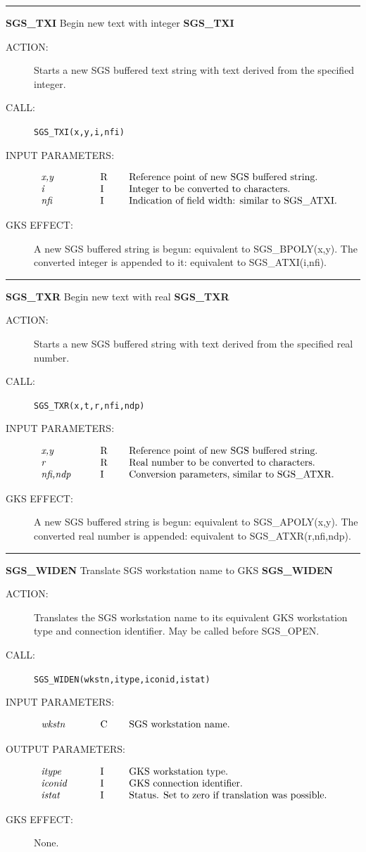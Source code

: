 \documentclass[11pt]{article}
\newcommand{\htmlref}[2]{#1}
\newcommand{\xlabel}[1]{}
\newcommand{\rthead}[2]{\rule{\textwidth}{0.3mm}
{\Large {\bf #1} \hfill #2 \hfill {\bf #1}}}
\newenvironment{params}%
{\[\begin{tabular}{p{0.14\textwidth}p{0.05\textwidth}p{0.66\textwidth}}}%
{\end{tabular}\]}
\newcommand{\rparams}[3]{{\em #1} &#2 &#3\\}
\newcommand{\rthead}[2]{\subsection{\label{#1}\xlabel{#1}#1 - #2}}
\newenvironment{params}{\begin{description}}{\end{description}}
\newcommand{\rparams}[3]{\item{{\em #1}} (#2) #3}
\begin{document}
\rthead{SGS\_TXI}{Begin new text with integer}
\begin{description}
\item [ACTION:]
Starts a new SGS buffered text string with text derived from the specified
integer.
\item [CALL:]
{\tt SGS\_TXI(x,y,i,nfi)}
\item [INPUT PARAMETERS:]
\begin{params}
\rparams{x,y}{R}{Reference point of new SGS buffered string.}
\rparams{i}{I}{Integer to be converted to characters.}
\rparams{nfi}{I}{Indication of field width: similar to 
\htmlref{SGS\_ATXI}{SGS_ATXT}.}
\end{params}
\item [GKS EFFECT:]
A new SGS buffered string is begun: equivalent to 
\htmlref{SGS\_BPOLY}{SGS_BPOLY}(x,y).
The converted integer is appended to it: equivalent to 
\htmlref{SGS\_ATXI}{SGS_ATXI}(i,nfi).
\end{description}
\goodbreak

\rthead{SGS\_TXR}{Begin new text with real}
\begin{description}
\item [ACTION:]
Starts a new SGS buffered string with text derived from the specified real
number.
\item [CALL:]
{\tt SGS\_TXR(x,t,r,nfi,ndp)}
\item [INPUT PARAMETERS:]
\begin{params}
\rparams{x,y}{R}{Reference point of new SGS buffered string.}
\rparams{r}{R}{Real number to be converted to characters.}
\rparams{nfi,ndp}{I}{Conversion parameters, similar to 
\htmlref{SGS\_ATXR}{SGS_ATXR}.}
\end{params}
\item [GKS EFFECT:]
A new SGS buffered string is begun: equivalent to 
\htmlref{SGS\_APOLY}{SGS_APOLY}(x,y).
The converted real number is appended: equivalent to 
\htmlref{SGS\_ATXR}{SGS_ATXR}(r,nfi,ndp).
\end{description}
\goodbreak

\rthead{SGS\_WIDEN}{Translate SGS workstation name to GKS}
\begin{description}
\item [ACTION:]
Translates the SGS workstation name to its equivalent GKS workstation type
and connection identifier.
May be called before SGS\_OPEN.
\item [CALL:]
{\tt SGS\_WIDEN(wkstn,itype,iconid,istat)}
\item [INPUT PARAMETERS:]
\begin{params}
\rparams{wkstn}{C}{SGS workstation name.}
\end{params}
\item [OUTPUT PARAMETERS:]
\begin{params}
\rparams{itype}{I}{GKS workstation type.}
\rparams{iconid}{I}{GKS connection identifier.}
\rparams{istat}{I}{Status. Set to zero if translation was possible.}
\end{params}
\item [GKS EFFECT:]
None.
\end{description}
\goodbreak
\end{document}
